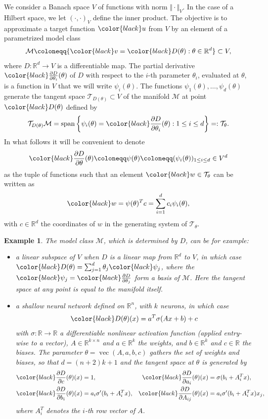 \documentclass{article}
\theoremstyle{noparens}
\newtheorem{example}{Example}[section]
\newcommand{\cT}{\mathcal{T}}
\newcommand{\cM}{\mathcal{M}}
\newcommand{\R}{\mathbb{R}}
\newcommand{\colorV}{\color{black}}
\newcommand{\colorM}{\color{black}}
\newcommand{\colorT}{\color{black}}
\renewcommand{\u}{{\colorV u}}
\newcommand{\params}{\theta}
\newcommand{\Dp}{{\colorM D(\params)}}
\renewcommand{\v}{{\colorM v}}
\newcommand{\dDdpi}{{{\colorT \frac{\partial D}{\partial \params_i}}}}
\newcommand{\dDdpj}{{\colorT \frac{\partial D}{\partial \params_j}}}
\begin{document}
We consider a Banach space $V$ of  functions with norm $\Vert \cdot \Vert_V$. In the case of a Hilbert space, we let $({\cdot,\cdot})_V$  define the inner product.
The objective is to approximate a target function $\u$ from $V$ by an element  of a  parametrized model class
$$\cM\coloneqq\{\v=\Dp : \theta \in \R^d\} \subset V,$$
where
$D: \R^d \to V$ is a differentiable map. The  partial derivative $\dDdpi(\theta)$ of $D$ with respect to the $i$-th parameter $\theta_i$, evaluated at $\theta$,  is a function in $V$ that we will write $\psi_i(\theta)$.
The functions $\psi_1(\theta),\dots, \psi_d(\theta)$ generate the tangent space $\cT_{D(\theta)} \subset V$ of the manifold $\cM$ at point $\Dp$ defined by
$$
\cT_{D(\theta)}\mathcal{M} = \operatorname{span} \left\{\psi_i(\theta) =  \dDdpi(\theta) : 1\le i \le d \right \} =: \cT_\theta.
$$
In what follows it will be convenient to denote $$ {\colorT\frac{\partial D}{\partial \theta}}(\theta) \coloneqq\psi(\theta) \coloneqq(\psi_i(\theta))_{1\le i\le d}\in V^d$$
as the tuple of functions such that  an element ${\colorT w} \in \cT_{\theta}$ can be written as
$$
{\colorT w}= \psi(\theta)^T c =\sum_{i=1}^d c_i \psi_i(\theta),
$$
with $c\in\R^d$ the coordinates of $w$ in the generating system of $\cT_{\theta}$.

\vspace{10pt}
\begin{example}
    The  {model class} $\cM$, which is determined by $D$, can be for example:
    \begin{itemize}
        \item a linear subspace of $V$ when $D$ is a linear map from $ \mathbb{R}^d$ to $V$, in which case
        $\Dp=\sum_{j=1}^{d} \theta_j {\colorT \psi_j}$, where the ${\colorT \psi_j} = \dDdpj$ form a basis of  $\cM$. Here the tangent space at any point is equal to the manifold itself.
        \item a shallow neural network defined on $\mathbb{R}^n$, with $k$ neurons, in which case
        $$\Dp(x) = a^T\sigma(A x + b) + c$$
        with $\sigma: \R \to \R$ a differentiable nonlinear activation function (applied entry-wise to a vector), $A\in\R^{k\times n}$ and $a\in\R^{ k}$ the weights, and $b\in\R^{k}$ and $c \in \mathbb{R}$ the biases. The parameter $\theta = \operatorname{vec}(A, a, b, c)$ gathers    the set of weights and biases, so that $d=(n+2)k+1$ and the tangent space at $\theta$ is generated by
        \begin{align*}
        &{\colorT\frac{\partial D}{\partial c}}(\theta)(x)=1,  &{\colorT\frac{\partial D}{\partial a_i}}(\theta)(x)&=\sigma(b_i+A_i^T x),\\
        &{\colorT\frac{\partial D}{\partial b_i}}(\theta)(x)=a_i\sigma'(b_i+A_i^T x),  &{\colorT\frac{\partial D}{\partial A_{ij}}}(\theta)(x)&=a_i\sigma'(b_i+A_i^T x)x_j,
        \end{align*}
        where $A_i^T$ denotes the $i$-th row vector of $A$.
    \end{itemize}
\end{example}
\end{document}
